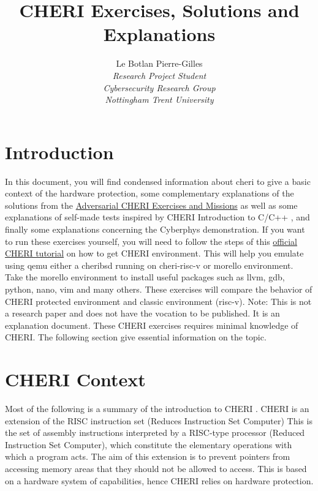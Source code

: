 \documentclass[a4paper, 11pt]{article}
\title{CHERI Exercises, Solutions and Explanations}
\author{Le Botlan Pierre-Gilles \\\textit{Research Project Student} \\ \textit{Cybersecurity Research Group} \\ \textit{Nottingham Trent University} }
\begin{document}
\maketitle
\tableofcontents
{}

\section{Introduction}
In this document, you will find condensed information about \Gls{cheri} to give a basic context of the hardware protection, some complementary explanations of the solutions from the \href{https://ctsrd-cheri.github.io/cheri-exercises/cover/index.html}{Adversarial CHERI Exercises and Missions} as well as some explanations of self-made tests inspired by CHERI Introduction to C/C++ \cite{watson2020cheri}, and finally some explanations concerning the Cyberphys demonstration. 
If you want to run these exercises yourself, you will need to follow the steps of this \href{https://ctsrd-cheri.github.io/cheri-faq/#how-can-i-emulate-a-cheri-enabled-environment}{official CHERI tutorial} on how to get CHERI environment. This will help you emulate using \Gls{qemu} either a \Gls{cheribsd} running on \Gls{cheri-risc-v} or \Gls{morello} environment. Take the \Gls{morello} environment to install useful packages such as llvm, gdb, python, nano, vim and many others.
These exercises will compare the behavior of CHERI protected environment and classic environment (\Gls{risc-v}).
Note: This is not a research paper and does not have the vocation to be published. It is an explanation document.
These CHERI exercises requires minimal knowledge of CHERI. The following section give essential information on the topic.

\printnoidxglossaries


\section{CHERI Context}
Most of the following is a summary of the introduction to CHERI \cite{watson2019introduction}.
CHERI is an extension of the RISC instruction set (Reduces Instruction Set Computer)
This is the set of assembly instructions interpreted by a RISC-type processor (Reduced Instruction Set Computer), which constitute the elementary operations with which a program acts.
The aim of this extension is to prevent pointers from accessing memory areas that they should not be allowed to access. This is based on a hardware system of capabilities, hence CHERI relies on hardware protection.
\end{document}
